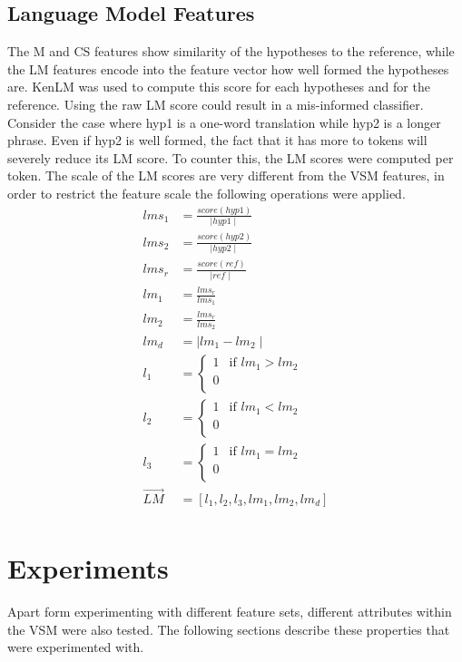 \documentclass[11pt]{article}
\begin{document}
\subsection{Language Model Features}
The M and CS features show similarity of the hypotheses to the reference, while
the LM features encode into the feature vector how well formed the hypotheses
are. KenLM was used to compute this score for each hypotheses and for the
reference. Using the raw LM score could result in a mis-informed classifier.
Consider the case where hyp1 is a one-word translation while hyp2 is a longer
phrase. Even if hyp2 is well formed, the fact that it has more to tokens will
severely reduce its LM score. To counter this, the LM scores were computed per
token. The scale of the LM scores are very different from the VSM features, in
order to restrict the feature scale the following operations were applied.
\begin{align*}
lms_1 &= \frac{score(hyp1)} {\mid hyp1 \mid}\\
lms_2 &= \frac{score(hyp2)} {\mid hyp2 \mid}\\
lms_r &= \frac{score(ref)} {\mid ref \mid}\\
lm_1 &= \frac{lms_r}{lms_1}\\
lm_2 &= \frac{lms_r}{lms_2}\\
lm_d &= \mid lm_1 - lm_2 \mid\\
l_1 &= \begin{cases} 1 &\mbox{if } lm_1 > lm_2\\
0\\
\end{cases}\\
l_2 &= \begin{cases} 1 &\mbox{if } lm_1 < lm_2\\
0\\
\end{cases}\\
l_3 &= \begin{cases} 1 &\mbox{if } lm_1 = lm_2\\
0\\
\end{cases}\\
\vec{LM} &= [l_1, l_2, l_3, lm_1, lm_2, lm_d]\\
\end{align*}
\section{Experiments}
Apart form experimenting with different feature sets, different attributes
within the VSM were also tested. The following sections describe these
properties that were experimented with.
\end{document}
